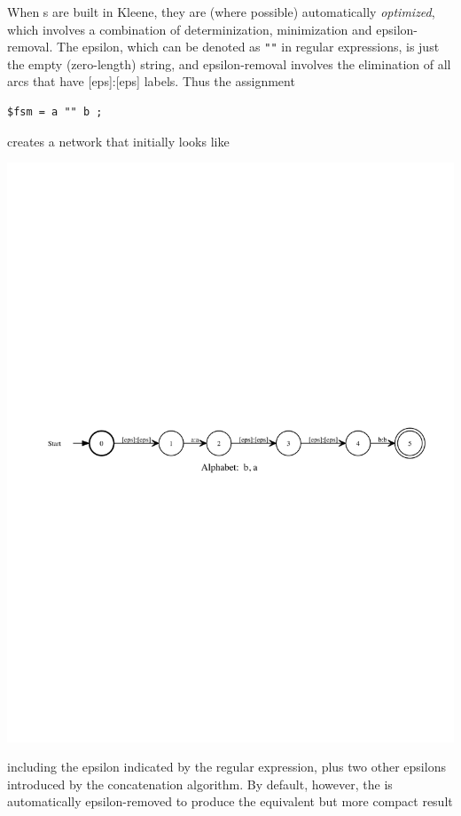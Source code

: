 When \fsm{}s are built in Kleene, they are (where possible) automatically \emph{optimized}, which involves a
combination of determinization, minimization and epsilon-removal.  The epsilon, which can be
denoted as \verb!""! in regular expressions, is just the empty
(zero-length) string, and epsilon-removal involves the
elimination of all arcs that have [eps]:[eps] labels.  Thus the assignment


\begin{Verbatim}
$fsm = a "" b ;
\end{Verbatim}

\noindent
creates a network that initially looks like 

\begin{center}
\includegraphics[width=135mm]{images/aEpsb.pdf}
\end{center}

\noindent
including the epsilon indicated by the regular expression, plus two other epsilons
introduced by the concatenation algorithm.  By default, however, the \fsm{}
is automatically epsilon-removed to produce the equivalent but more compact result

